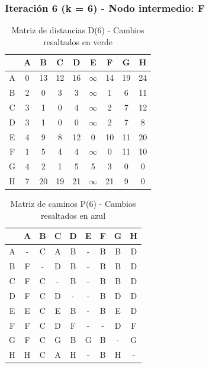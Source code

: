 \documentclass[12pt]{article}
\begin{document}
\subsubsection{Iteración 6 (k = 6) - Nodo intermedio: F}
\begin{table}[h!]
\centering
\begin{tabular}{|c|c|c|c|c|c|c|c|c|}
\hline
 & A & B & C & D & E & F & G & H \\\hline
A & 0 & 13 & 12 & 16 & $\infty$ & 14 & 19 & 24 \\\hline
B & \cellcolor{lightgreen} 2 & 0 & 3 & 3 & $\infty$ & 1 & 6 & 11 \\\hline
C & \cellcolor{lightgreen} 3 & 1 & 0 & 4 & $\infty$ & 2 & 7 & 12 \\\hline
D & \cellcolor{lightgreen} 3 & 1 & 0 & 0 & $\infty$ & 2 & 7 & 8 \\\hline
E & 4 & 9 & 8 & 12 & 0 & 10 & 11 & 20 \\\hline
F & 1 & 5 & 4 & 4 & $\infty$ & 0 & 11 & 10 \\\hline
G & \cellcolor{lightgreen} 4 & 2 & 1 & 5 & 5 & 3 & 0 & 0 \\\hline
H & 7 & 20 & 19 & 21 & $\infty$ & 21 & 9 & 0 \\\hline
\end{tabular}
\caption{Matriz de distancias D(6) - Cambios resaltados en verde}
\end{table}

\begin{table}[h!]
\centering
\begin{tabular}{|c|c|c|c|c|c|c|c|c|}
\hline
 & A & B & C & D & E & F & G & H \\\hline
A & - & C & A & B & - & B & B & D \\\hline
B & \cellcolor{lightblue} F & - & D & B & - & B & B & D \\\hline
C & \cellcolor{lightblue} F & C & - & B & - & B & B & D \\\hline
D & \cellcolor{lightblue} F & C & D & - & - & B & D & D \\\hline
E & E & C & E & B & - & B & E & D \\\hline
F & F & C & D & F & - & - & D & F \\\hline
G & \cellcolor{lightblue} F & C & G & B & G & B & - & G \\\hline
H & H & C & A & H & - & B & H & - \\\hline
\end{tabular}
\caption{Matriz de caminos P(6) - Cambios resaltados en azul}
\end{table}
\end{document}
